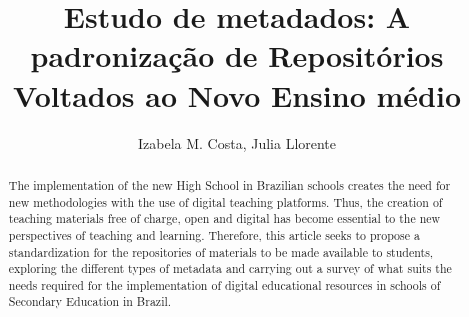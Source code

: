 \documentclass[12pt]{article}
\title{Estudo de metadados: A padronização de Repositórios Voltados ao Novo Ensino médio}
\author{Izabela M. Costa\inst{1}, Julia Llorente\inst{2}}
\begin{document}
 

\maketitle

\begin{abstract}
 The implementation of the new High School in Brazilian schools creates the need for new methodologies with the use of digital teaching platforms. Thus, the creation of teaching materials free of charge, open and digital has become essential to the new perspectives of teaching and learning. Therefore, this article seeks to propose a standardization for the repositories of
materials to be made available to students, exploring the different types
of metadata and carrying out a survey of what suits the needs
required for the implementation of digital educational resources in schools
of Secondary Education in Brazil.

\end{abstract}
\end{document}

